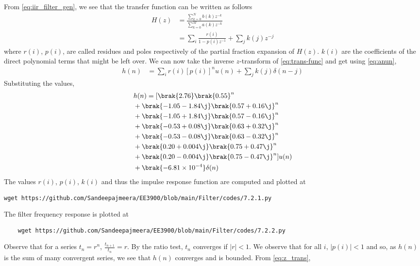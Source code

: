 \documentclass[journal,12pt,twocolumn]{IEEEtran}
\renewcommand\thesection{\arabic{section}}
\begin{document}
\begin{enumerate}[label=\thesection.\arabic*]
From \eqref{eq:iir_filter_gen}, we see that the transfer function can be written as follows
\begin{align}
	H(z) &= \frac{\sum_{k = 0}^{N}b(k)z^{-k}}{\sum_{k = 0}^{M}a(k)z^{-k}} \\
		 &= \sum_{i}\frac{r(i)}{1 - p(i)z^{-1}} + \sum_{j}k(j)z^{-j}
	\label{eq:trans-func}
\end{align}
where $r(i)$, $p(i)$, are called residues and poles respectively of the partial 
fraction expansion of $H(z)$. $k(i)$ are the coefficients of the direct polynomial 
terms that might be left over. We can now take the inverse $z$-transform of
\eqref{eq:trans-func} and get using \eqref{eq:anun},
\begin{align}
	h(n) &= \sum_{i}r(i)[p(i)]^nu(n) + \sum_{j}k(j)\delta(n - j)
	\label{eq:h-n-expr}
\end{align}
Substituting the values,
\begin{align}
	&h(n) = [\brak{2.76}\brak{0.55}^n \nonumber \\ 
	&+ \brak{-1.05-1.84\j}\brak{0.57+0.16\j}^n \nonumber \\
	&+ \brak{-1.05+1.84\j}\brak{0.57-0.16\j}^n \nonumber \\
	&+ \brak{-0.53+0.08\j}\brak{0.63+0.32\j}^n \nonumber \\
	&+ \brak{-0.53-0.08\j}\brak{0.63-0.32\j}^n \nonumber \\
	&+ \brak{0.20+0.004\j}\brak{0.75+0.47\j}^n \nonumber \\
	&+ \brak{0.20-0.004\j}\brak{0.75-0.47\j}^n]u(n) \nonumber \\
	&+ \brak{-6.81 \times 10^{-4}}\delta(n)
\end{align}
The values $r(i)$, $p(i)$, $k(i)$ and thus the impulse response function are computed and plotted at
\begin{lstlisting}
wget https://github.com/Sandeepajmeera/EE3900/blob/main/Filter/codes/7.2.1.py
\end{lstlisting}
The filter frequency response is plotted at
\begin{lstlisting}
	wget https://github.com/Sandeepajmeera/EE3900/blob/main/Filter/codes/7.2.2.py
\end{lstlisting}
Observe that for a series $t_n = r^n$, $\frac{t_{n + 1}}{t_n} = r$.
By the ratio test, $t_n$ converges if $|r| < 1$. We observe that for all $i$, 
$|p(i)| < 1$ and so, as $h(n)$ is the sum of many convergent series,
we see that $h(n)$ converges and is bounded. From \eqref{eq:z_trans},
\begin{align}

\end{align}
\end{enumerate}
\end{document}
